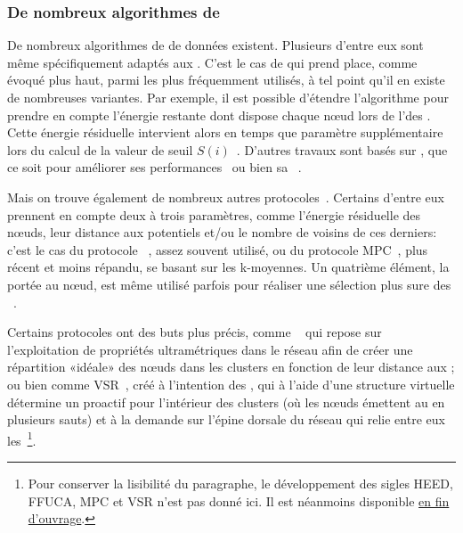         \subsubsection{De nombreux algorithmes de }
De nombreux algorithmes de  de données existent.
Plusieurs d'entre eux sont même spécifiquement adaptés aux \rcsfs.
C'est le cas de \leach qui prend place, comme évoqué plus haut, parmi les plus fréquemment utilisés, à tel point qu'il en existe de nombreuses variantes.
Par exemple, il est possible d'étendre l'algorithme pour prendre en compte l'énergie restante dont dispose chaque nœud lors de l'\election des \CH.
Cette énergie résiduelle intervient alors en temps que paramètre supplémentaire lors du calcul de la valeur de seuil $S(i)$~\cite{HHT02}.
D'autres travaux sont basés sur \leach, que ce soit pour améliorer ses performances~\cite{RR13,CJ14} ou bien sa \secu~\cite{OFVWBDL07}.

Mais on trouve également de nombreux autres protocoles~\cite{AY07,DQWH13}.
Certains d'entre eux prennent en compte deux à trois paramètres, comme l'énergie résiduelle des nœuds, leur distance aux \chs potentiels et/ou le nombre de voisins de ces derniers: c'est le cas du protocole \heed~\cite{YF04}, assez souvent utilisé, ou du protocole MPC~\cite{KTAA12}, plus récent et moins répandu, se basant sur les k-moyennes.
Un quatrième élément, la  portée au nœud, est même utilisé parfois pour réaliser une sélection plus sure des \CH~\cite{KMSL09}.

Certains protocoles ont des buts plus précis, comme \ffuca~\cite{FL11,FMMMI12} qui repose sur l'exploitation de propriétés ultramétriques dans le réseau afin de créer une répartition «idéale» des nœuds dans les clusters en fonction de leur distance aux \CH; ou bien comme VSR~\cite{TV08}, créé à l'intention des \manet, qui à l'aide d'une structure virtuelle détermine un  proactif pour l'intérieur des clusters (où les nœuds émettent au \ch en plusieurs sauts) et à la demande sur l'épine dorsale du réseau qui relie entre eux les \CH\,\footnote{Pour conserver la lisibilité du paragraphe, le développement des sigles HEED, FFUCA, MPC et VSR n'est pas donné ici. Il est néanmoins disponible \hyperref[sigles]{en fin d'ouvrage}.}.

